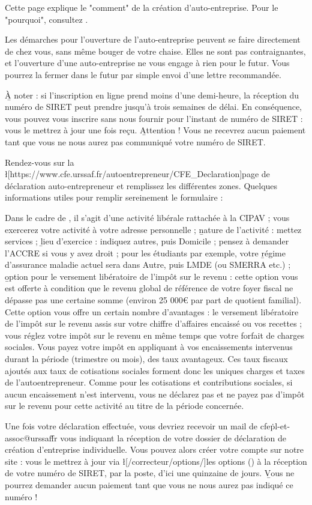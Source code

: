 ﻿Cette page explique le "comment" de la création d'auto-entreprise. Pour le "pourquoi", consultez .

Les démarches pour l'ouverture de l'auto-entreprise peuvent se faire directement de chez vous, sans même bouger de votre chaise.
Elles ne sont pas contraignantes, et l'ouverture d'une auto-entreprise ne vous engage à rien pour le futur. Vous pourrez la fermer dans le futur par simple envoi d'une lettre recommandée.

\b{À noter} : si l'inscription en ligne prend moins d'une demi-heure, la réception du numéro de SIRET peut prendre jusqu'à trois semaines de délai. En conséquence, vous pouvez vous inscrire sans nous fournir pour l'instant de numéro de SIRET : vous le mettrez à jour une fois reçu.
\b{Attention !} Vous ne recevrez aucun paiement tant que vous ne nous aurez pas communiqué votre numéro de SIRET.

Rendez-vous sur la \l[https://www.cfe.urssaf.fr/autoentrepreneur/CFE_Declaration]{page de déclaration auto-entrepreneur} et remplissez les différentes zones. Quelques informations utiles pour remplir sereinement le formulaire :
\begin{itemize}
	\li Dans le cadre de \eDevoir, il s'agit d'une activité libérale rattachée à la CIPAV ;
	\li vous exercerez votre activité à votre adresse personnelle ;
	\li \b{nature de l'activité} : mettez services ;
	\li \b{lieu d'exercice} : indiquez autres, puis Domicile ;
	\li pensez à demander l'ACCRE si vous y avez droit ;
	\li pour les étudiants par exemple, votre \b{régime d'assurance maladie actuel} sera dans Autre, puis LMDE (ou SMERRA etc.) ;
	\li \b{option pour le versement libératoire de l'impôt sur le revenu} : cette option vous est offerte à condition que le revenu global de référence de votre foyer fiscal ne dépasse pas une certaine somme (environ 25 000€ par part de quotient familial). Cette option vous offre un certain nombre d’avantages : le versement libératoire de l’impôt sur le revenu assis sur votre chiffre d’affaires encaissé ou vos recettes ; vous réglez votre impôt sur le revenu en même temps que votre forfait de charges sociales. Vous payez votre impôt en appliquant à vos encaissements intervenus durant la période (trimestre ou mois), des taux avantageux. Ces taux fiscaux ajoutés aux taux de cotisations sociales forment donc les uniques charges et taxes de l’autoentrepreneur. Comme pour les cotisations et contributions sociales, si aucun encaissement n’est intervenu, vous ne déclarez pas et ne payez pas d’impôt sur le revenu pour cette activité au titre de la période concernée.
\end{itemize}

Une fois votre déclaration effectuée, vous devriez recevoir un mail de cfe\.pl-et-assoc@urssaf\.fr vous indiquant la réception de votre dossier de déclaration de création d'entreprise individuelle.
Vous pouvez alors créer votre compte sur notre site : vous le mettrez à jour via \l[/correcteur/options/]{les options} () à la réception de votre numéro de SIRET, par la poste, d'ici une quinzaine de jours.
\b{Vous ne pourrez demander aucun paiement tant que vous ne nous aurez pas indiqué ce numéro} !